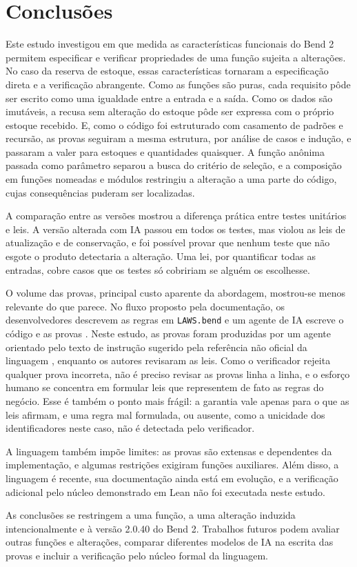 \section{Conclusões}
\label{sect:concl}

Este estudo investigou em que medida as características funcionais do Bend 2 permitem especificar e verificar propriedades de uma função sujeita a alterações. No caso da reserva de estoque, essas características tornaram a especificação direta e a verificação abrangente. Como as funções são puras, cada requisito pôde ser escrito como uma igualdade entre a entrada e a saída. Como os dados são imutáveis, a recusa sem alteração do estoque pôde ser expressa com o próprio estoque recebido. E, como o código foi estruturado com casamento de padrões e recursão, as provas seguiram a mesma estrutura, por análise de casos e indução, e passaram a valer para estoques e quantidades quaisquer. A função anônima passada como parâmetro separou a busca do critério de seleção, e a composição em funções nomeadas e módulos restringiu a alteração a uma parte do código, cujas consequências puderam ser localizadas.

A comparação entre as versões mostrou a diferença prática entre testes unitários e leis. A versão alterada com IA passou em todos os testes, mas violou as leis de atualização e de conservação, e foi possível provar que nenhum teste que não esgote o produto detectaria a alteração. Uma lei, por quantificar todas as entradas, cobre casos que os testes só cobririam se alguém os escolhesse.

O volume das provas, principal custo aparente da abordagem, mostrou-se menos relevante do que parece. No fluxo proposto pela documentação, os desenvolvedores descrevem as regras em \texttt{LAWS.bend} e um agente de IA escreve o código e as provas \cite{BendRepo}. Neste estudo, as provas foram produzidas por um agente orientado pelo texto de instrução sugerido pela referência não oficial da linguagem \cite{BendAgents}, enquanto os autores revisaram as leis. Como o verificador rejeita qualquer prova incorreta, não é preciso revisar as provas linha a linha, e o esforço humano se concentra em formular leis que representem de fato as regras do negócio. Esse é também o ponto mais frágil: a garantia vale apenas para o que as leis afirmam, e uma regra mal formulada, ou ausente, como a unicidade dos identificadores neste caso, não é detectada pelo verificador.

A linguagem também impõe limites: as provas são extensas e dependentes da implementação, e algumas restrições exigiram funções auxiliares. Além disso, a linguagem é recente, sua documentação ainda está em evolução, e a verificação adicional pelo núcleo demonstrado em Lean não foi executada neste estudo.

As conclusões se restringem a uma função, a uma alteração induzida intencionalmente e à versão 2.0.40 do Bend 2. Trabalhos futuros podem avaliar outras funções e alterações, comparar diferentes modelos de IA na escrita das provas e incluir a verificação pelo núcleo formal da linguagem.
